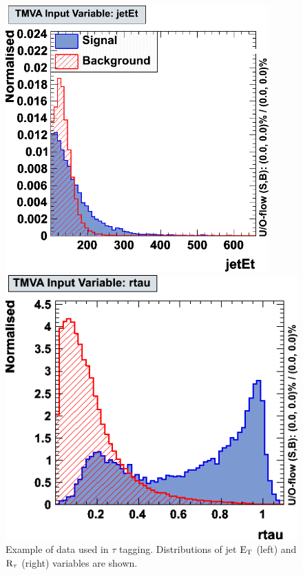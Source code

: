 \documentclass[a4paper]{jpconf}
\begin{document}
\begin{figure}[h]
 \begin{minipage}{7.8cm}
\includegraphics[width=0.9\textwidth]{images/jetet.png}
\end{minipage}
 \hfill
\begin{minipage}{7.8cm}
\includegraphics[width=1.0\textwidth]{images/rtau.png}
\end{minipage}

\caption{Example of data used in $\tau$ tagging.
Distributions of jet ${\rm E}_{\rm T}$ (left) and ${\rm R}_{\tau}$ (right) variables are shown.}
\label{fig:variables}
\end{figure}
\end{document}
